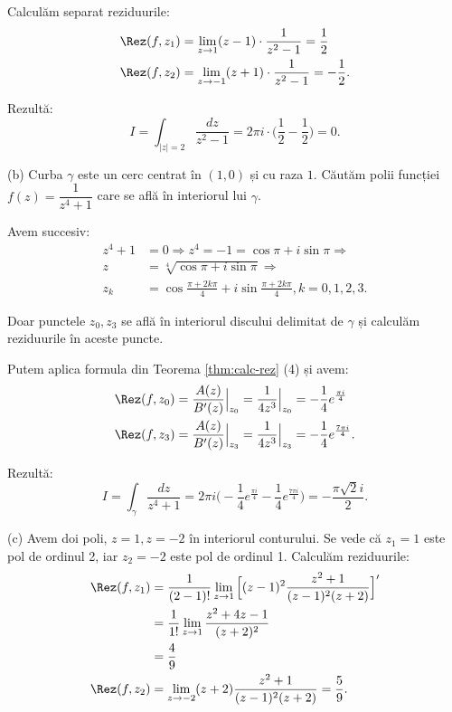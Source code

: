 Calculăm separat reziduurile:
\begin{align*}
  \Rez(f, z_1) &= \lim_{z \to 1} (z - 1) \cdot \frac{1}{z^2 - 1} = \frac{1}{2} \\
  \Rez(f, z_2) &= \lim_{z \to -1} (z + 1) \cdot \frac{1}{z^2 - 1} = -\frac{1}{2}.
\end{align*}

Rezultă:
\[
  I = \int_{|z| = 2} \frac{dz}{z^2 - 1} = 2 \pi i \cdot \Big( \frac{1}{2} - \frac{1}{2} \Big) = 0.
\]

\vspace{1cm}

(b) Curba $ \gamma $ este un cerc centrat în $ (1, 0) $ și cu raza $ 1 $. Căutăm
polii funcției $ f(z) = \dfrac{1}{z^4 + 1} $ care se află în interiorul lui $ \gamma $.

Avem succesiv:
\begin{align*}
  z^4 + 1 &= 0 \Rightarrow z^4 = -1 = \cos \pi + i \sin \pi \Rightarrow \\
  z &= \sqrt[4]{\cos \pi + i \sin \pi} \Rightarrow \\
  z_k &= \cos \frac{\pi + 2k\pi}{4} + i \sin \frac{\pi + 2k\pi}{4}, k = 0, 1, 2, 3.
\end{align*}

Doar punctele $ z_0, z_3 $ se află în interiorul discului delimitat de $ \gamma $
și calculăm reziduurile în aceste puncte.

Putem aplica formula din Teorema \ref{thm:calc-rez} (4) și avem:
\begin{align*}
  \Rez(f, z_0) &= \frac{A(z)}{B'(z)}\Big|_{z_0} = \frac{1}{4z^3}\Big|_{z_0} %
                 = -\frac{1}{4} e^{\frac{\pi i}{4}} \\
  \Rez(f, z_3) &= \frac{A(z)}{B'(z)}\Big|_{z_3} = \frac{1}{4z^3}\Big|_{z_3} %
                 = - \frac{1}{4} e^{\frac{7 \pi i}{4}}.
\end{align*}

Rezultă:
\[
  I = \int_\gamma \frac{dz}{z^4 + 1} = %
  2 \pi i \Big( -\frac{1}{4} e^{\frac{\pi i}{4}} - \frac{1}{4} e^{\frac{7 \pi i}{4}} \Big) = %
  -\frac{\pi \sqrt{2} i}{2}.
\]

\vspace{1cm}

(c) Avem doi poli, $ z = 1, z = -2 $ în interiorul conturului. Se vede că $ z_1 = 1 $
este pol de ordinul 2, iar $ z_2 = -2 $ este pol de ordinul 1. Calculăm reziduurile:
\begin{align*}
  \Rez(f, z_1) &= \frac{1}{(2-1)!} \lim_{z \to 1} \Big[ (z - 1)^2 \frac{z^2 + 1}{(z - 1)^2(z + 2)} \Big]^\prime \\
               &= \frac{1}{1!} \lim_{z \to 1} \frac{z^2 + 4z - 1}{(z + 2)^2} \\
               &= \frac{4}{9} \\
  \Rez(f, z_2) &= \lim_{z \to -2} (z + 2) \frac{z^2 + 1}{(z - 1)^2(z + 2)} = \frac{5}{9}.
\end{align*}

